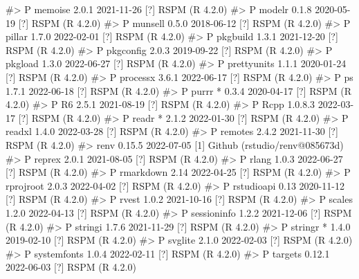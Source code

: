 \documentclass[
  11pt,
  letterpaper,
  DIV=11,
  numbers=noendperiod]{scrartcl}
\newenvironment{Shaded}{}{}
\newcommand{\CommentTok}[1]{\textcolor[rgb]{0.42,0.45,0.49}{#1}}
\begin{document}
\begin{Shaded}
\begin{Highlighting}[]
\CommentTok{\#\textgreater{}  P memoise       2.0.1   2021{-}11{-}26 [?] RSPM (R 4.2.0)}
\CommentTok{\#\textgreater{}  P modelr        0.1.8   2020{-}05{-}19 [?] RSPM (R 4.2.0)}
\CommentTok{\#\textgreater{}  P munsell       0.5.0   2018{-}06{-}12 [?] RSPM (R 4.2.0)}
\CommentTok{\#\textgreater{}  P pillar        1.7.0   2022{-}02{-}01 [?] RSPM (R 4.2.0)}
\CommentTok{\#\textgreater{}  P pkgbuild      1.3.1   2021{-}12{-}20 [?] RSPM (R 4.2.0)}
\CommentTok{\#\textgreater{}  P pkgconfig     2.0.3   2019{-}09{-}22 [?] RSPM (R 4.2.0)}
\CommentTok{\#\textgreater{}  P pkgload       1.3.0   2022{-}06{-}27 [?] RSPM (R 4.2.0)}
\CommentTok{\#\textgreater{}  P prettyunits   1.1.1   2020{-}01{-}24 [?] RSPM (R 4.2.0)}
\CommentTok{\#\textgreater{}  P processx      3.6.1   2022{-}06{-}17 [?] RSPM (R 4.2.0)}
\CommentTok{\#\textgreater{}  P ps            1.7.1   2022{-}06{-}18 [?] RSPM (R 4.2.0)}
\CommentTok{\#\textgreater{}  P purrr       * 0.3.4   2020{-}04{-}17 [?] RSPM (R 4.2.0)}
\CommentTok{\#\textgreater{}  P R6            2.5.1   2021{-}08{-}19 [?] RSPM (R 4.2.0)}
\CommentTok{\#\textgreater{}  P Rcpp          1.0.8.3 2022{-}03{-}17 [?] RSPM (R 4.2.0)}
\CommentTok{\#\textgreater{}  P readr       * 2.1.2   2022{-}01{-}30 [?] RSPM (R 4.2.0)}
\CommentTok{\#\textgreater{}  P readxl        1.4.0   2022{-}03{-}28 [?] RSPM (R 4.2.0)}
\CommentTok{\#\textgreater{}  P remotes       2.4.2   2021{-}11{-}30 [?] RSPM (R 4.2.0)}
\CommentTok{\#\textgreater{}    renv          0.15.5  2022{-}07{-}05 [1] Github (rstudio/renv@085673d)}
\CommentTok{\#\textgreater{}  P reprex        2.0.1   2021{-}08{-}05 [?] RSPM (R 4.2.0)}
\CommentTok{\#\textgreater{}  P rlang         1.0.3   2022{-}06{-}27 [?] RSPM (R 4.2.0)}
\CommentTok{\#\textgreater{}  P rmarkdown     2.14    2022{-}04{-}25 [?] RSPM (R 4.2.0)}
\CommentTok{\#\textgreater{}  P rprojroot     2.0.3   2022{-}04{-}02 [?] RSPM (R 4.2.0)}
\CommentTok{\#\textgreater{}  P rstudioapi    0.13    2020{-}11{-}12 [?] RSPM (R 4.2.0)}
\CommentTok{\#\textgreater{}  P rvest         1.0.2   2021{-}10{-}16 [?] RSPM (R 4.2.0)}
\CommentTok{\#\textgreater{}  P scales        1.2.0   2022{-}04{-}13 [?] RSPM (R 4.2.0)}
\CommentTok{\#\textgreater{}  P sessioninfo   1.2.2   2021{-}12{-}06 [?] RSPM (R 4.2.0)}
\CommentTok{\#\textgreater{}  P stringi       1.7.6   2021{-}11{-}29 [?] RSPM (R 4.2.0)}
\CommentTok{\#\textgreater{}  P stringr     * 1.4.0   2019{-}02{-}10 [?] RSPM (R 4.2.0)}
\CommentTok{\#\textgreater{}  P svglite       2.1.0   2022{-}02{-}03 [?] RSPM (R 4.2.0)}
\CommentTok{\#\textgreater{}  P systemfonts   1.0.4   2022{-}02{-}11 [?] RSPM (R 4.2.0)}
\CommentTok{\#\textgreater{}  P targets       0.12.1  2022{-}06{-}03 [?] RSPM (R 4.2.0)}

\end{Highlighting}
\end{Shaded}
\end{document}
